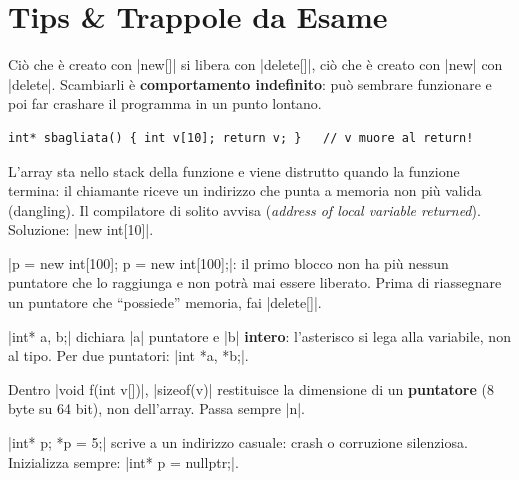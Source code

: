 \section{Tips \& Trappole da Esame}

\begin{trappola}
Ciò che è creato con \cc|new[]| si libera con \cc|delete[]|, ciò che è creato
con \cc|new| con \cc|delete|. Scambiarli è \textbf{comportamento indefinito}:
può sembrare funzionare e poi far crashare il programma in un punto lontano.
\end{trappola}

\begin{trappola}
\begin{lstlisting}
int* sbagliata() { int v[10]; return v; }   // v muore al return!
\end{lstlisting}
L'array sta nello stack della funzione e viene distrutto quando la funzione
termina: il chiamante riceve un indirizzo che punta a memoria non più valida
(dangling). Il compilatore di solito avvisa (\emph{address of local variable
returned}). Soluzione: \cc|new int[10]|.
\end{trappola}

\begin{trappola}
\cc|p = new int[100]; p = new int[100];|: il primo blocco non ha più nessun
puntatore che lo raggiunga e non potrà mai essere liberato. Prima di riassegnare
un puntatore che ``possiede'' memoria, fai \cc|delete[]|.
\end{trappola}

\begin{trappola}
\cc|int* a, b;| dichiara \cc|a| puntatore e \cc|b| \textbf{intero}: l'asterisco
si lega alla variabile, non al tipo. Per due puntatori: \cc|int *a, *b;|.
\end{trappola}

\begin{trappola}
Dentro \cc|void f(int v[])|, \cc|sizeof(v)| restituisce la dimensione di un
\textbf{puntatore} (8 byte su 64 bit), non dell'array. Passa sempre \cc|n|.
\end{trappola}

\begin{trappola}
\cc|int* p; *p = 5;| scrive a un indirizzo casuale: crash o corruzione
silenziosa. Inizializza sempre: \cc|int* p = nullptr;|.
\end{trappola}

